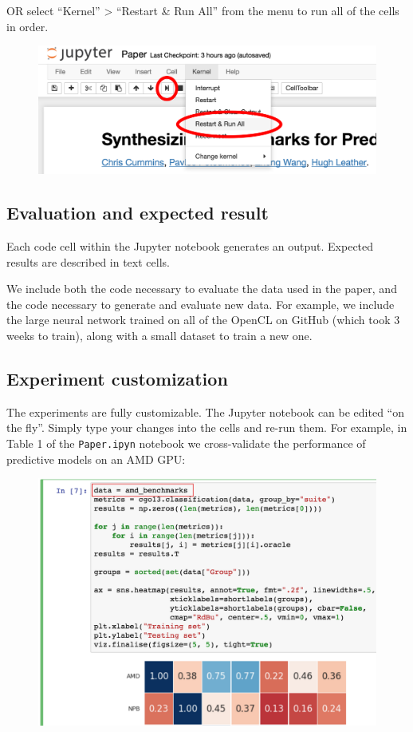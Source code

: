 \begin{enumerate}
OR select ``Kernel'' > ``Restart \& Run All'' from the menu to run all of the cells in order.
\begin{figure}[H]
  \includegraphics[width=\columnwidth]{img/jupyter}
\end{figure}
\end{enumerate}


\subsection{Evaluation and expected result}

Each code cell within the Jupyter notebook generates an output. Expected results are described in text cells.

We include both the code necessary to evaluate the data used in the paper, and the code necessary to generate and evaluate new data. For example, we include the large neural network trained on all of the OpenCL on GitHub (which took 3 weeks to train), along with a small dataset to train a new one.

\newpage
\subsection{Experiment customization}

The experiments are fully customizable. The Jupyter notebook can be edited ``on the fly''. Simply type your changes into the cells and re-run them. For example, in Table 1 of the \texttt{Paper.ipyn} notebook we cross-validate the performance of predictive models on an AMD GPU:

\begin{figure}[H]
  \includegraphics[width=\columnwidth]{img/example-1}
\end{figure}

